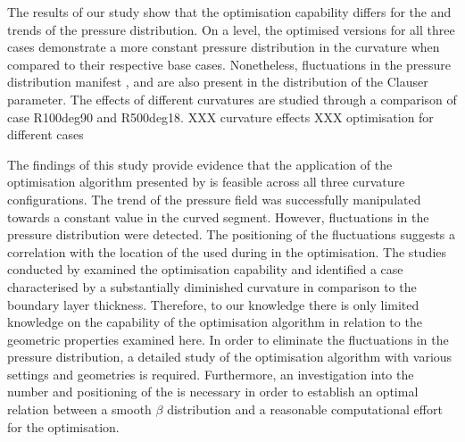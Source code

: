 The results of our study show that the optimisation capability differs for the  and  trends of the pressure distribution.
On a  level, the optimised versions for all three cases demonstrate a more constant pressure distribution in the curvature when compared to their respective base cases.
Nonetheless, fluctuations in the pressure distribution manifest  , and are also present in the distribution of the Clauser parameter.
The effects of different curvatures are studied through a comparison of case R100deg90 and R500deg18.
XXX curvature effects 
XXX optimisation for different cases


The findings of this study provide evidence that the application of the optimisation algorithm presented by \citet{morita_applying_2022} is feasible across all three curvature configurations.
The  trend of the pressure field was successfully manipulated towards a constant value in the curved segment.
However,  fluctuations in the pressure distribution were detected.
The positioning of the fluctuations suggests a correlation with the location  of the  used during  in the optimisation.
The studies conducted by \citet{ganagdhar_bayesian_2025} examined the optimisation capability and identified a case characterised by a substantially diminished curvature in comparison to the boundary layer thickness. 
Therefore, to our knowledge there is only limited knowledge  on the capability of the optimisation algorithm in relation to the geometric properties examined here.
In order to eliminate the  fluctuations in the pressure distribution, a detailed study of the optimisation algorithm with various settings and geometries is required.
Furthermore, an investigation into the number and positioning of the  is necessary in order to establish an optimal relation between a smooth $\beta$ distribution and a reasonable computational effort for the optimisation.


